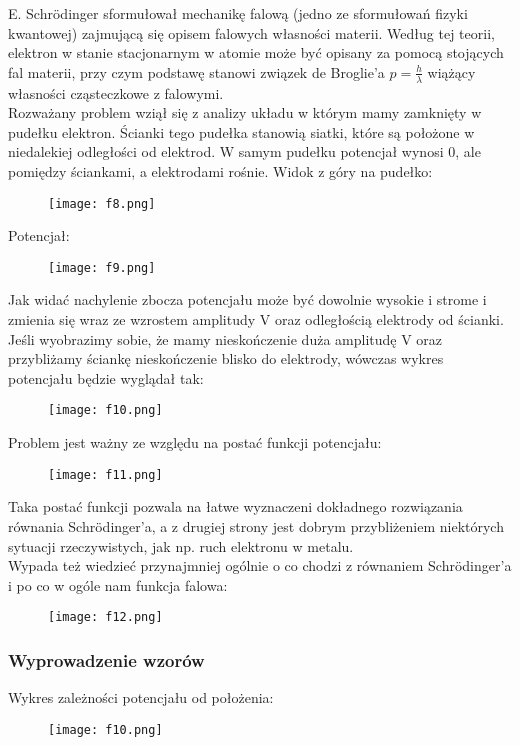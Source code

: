 \documentclass[a4paper,15pt]{article}
\begin{document}
E. Schrödinger sformułował mechanikę falową (jedno ze sformułowań fizyki kwantowej) zajmującą się opisem falowych własności materii. Według tej teorii, elektron w stanie stacjonarnym w atomie może być opisany za pomocą stojących fal materii, przy czym podstawę stanowi związek de Broglie'a $p=\frac{h}{\lambda}$ wiążący własności cząsteczkowe z falowymi. \\

Rozważany problem wziął się z analizy układu w którym mamy zamknięty w pudełku elektron. Ścianki tego pudełka stanowią siatki, które są położone w niedalekiej odległości od elektrod. W samym pudełku potencjał wynosi 0, ale pomiędzy ściankami, a elektrodami rośnie. Widok z góry na pudełko: 
\begin{figure}[H]
\centerline{\texttt{[image: f8.png]}}
\end{figure}
Potencjał:
\begin{figure}[H]
\centerline{\texttt{[image: f9.png]}}
\end{figure}
Jak widać nachylenie zbocza potencjału może być dowolnie wysokie i strome i zmienia się wraz ze wzrostem amplitudy V oraz odległością elektrody od ścianki. Jeśli wyobrazimy sobie, że mamy nieskończenie duża amplitudę V oraz przybliżamy ściankę nieskończenie blisko do elektrody, wówczas wykres potencjału będzie wyglądał tak: 
\begin{figure}[H]
\centerline{\texttt{[image: f10.png]}}
\end{figure}
Problem jest ważny ze względu na postać funkcji potencjału:
\begin{figure}[H]
\centerline{\texttt{[image: f11.png]}}
\end{figure}
Taka postać funkcji pozwala na łatwe wyznaczeni dokładnego rozwiązania równania Schrödinger'a, a z drugiej strony jest dobrym przybliżeniem niektórych sytuacji rzeczywistych, jak np. ruch elektronu w metalu. \\
Wypada też wiedzieć przynajmniej ogólnie o co chodzi z równaniem Schrödinger'a i po co w ogóle nam funkcja falowa:
\begin{figure}[H]
\centerline{\texttt{[image: f12.png]}}
\end{figure}


\newpage
\subsubsection{Wyprowadzenie wzorów}

Wykres zależności potencjału od położenia:
\begin{figure}[H]
\centerline{\texttt{[image: f10.png]}}
\end{figure}
\end{document}
